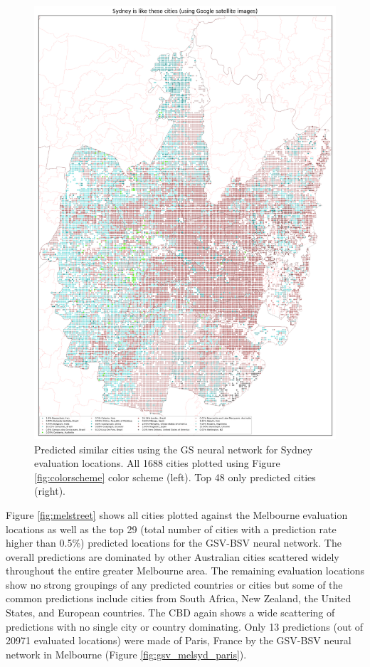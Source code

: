 \documentclass[sageh,times]{sagej}
\begin{document}
\begin{figure}[!htbp]
\includegraphics[scale=0.20]{Images/SydneyOverallAbrev_sat.png} 
\caption{Predicted similar cities using the GS neural network for Sydney evaluation locations. All 1688 cities plotted using Figure \ref{fig:colorscheme} color scheme (left). Top 48 only predicted cities (right).}    
 \label{fig:sydsat}  
\end{figure} 



Figure \ref{fig:melstreet} shows all cities plotted against the Melbourne evaluation locations as well as the top 29 (total number of cities with a prediction rate higher than 0.5\%) predicted locations for the GSV-BSV neural network. The overall predictions are dominated by other Australian cities scattered widely throughout the entire greater Melbourne area. The remaining evaluation locations show no strong groupings of any predicted countries or cities but some of the common predictions include cities from South Africa, New Zealand, the United States, and European countries. The CBD again shows a wide scattering of predictions with no single city or country dominating. Only 13 predictions (out of 20971 evaluated locations) were made of Paris, France by the GSV-BSV neural network in Melbourne (Figure \ref{fig:gsv_melsyd_paris}).
\end{document}
